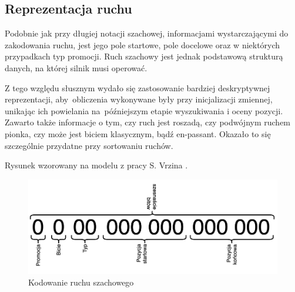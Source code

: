 \usepackage{csquotes}\subsection{Reprezentacja ruchu}
\label{subsec:reprezentacja-ruchu}

Podobnie jak przy długiej notacji szachowej, informacjami wystarczającymi do zakodowania ruchu, jest jego pole startowe, pole docelowe oraz w niektórych przypadkach typ promocji.
Ruch szachowy jest jednak podstawową strukturą danych, na której silnik musi operować.

Z tego względu słusznym wydało się zastosowanie bardziej deskryptywnej reprezentacji, aby~obliczenia wykonywane były przy inicjalizacji zmiennej, unikając ich powielania na~późniejszym etapie wyszukiwania i oceny pozycji.
Zawarto także informacje o tym, czy ruch jest roszadą, czy podwójnym ruchem pionka, czy może jest biciem klasycznym, bądź en-passant.
Okazało to się szczególnie przydatne przy sortowaniu ruchów.

Rysunek wzorowany na modelu z pracy S. Vrzina \cite*{Vrzina2023}.

\begin{figure}[ht]
    \centering
    \includegraphics[width=0.8\linewidth]{rozdzialy/rozdzial01/2_reprezentacja-pozycji/rysunki/kodowanie-ruchu}
    \caption{Kodowanie ruchu szachowego}
    \label{fig:kodowanie-ruchu}
\end{figure}
